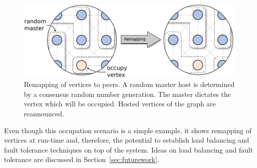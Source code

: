   \begin{figure}[H]
    \centering
    \includegraphics[width=\textwidth]{graphics/40_gol_remapping}
    \caption{Remapping of vertices to peers. A random master host is
      determined by a consensus random number generation. The master
      dictates the vertex which will be occupied. Hosted vertices of the
      graph are reannounced.}
    \label{fig:gol_remapping}
  \end{figure}

\noindent Even though this occupation scenario is a simple example, it
shows remapping of vertices at run-time and, therefore, the potential
to establish load balancing and fault tolerance techniques on top of
the system. Ideas on load balancing and fault tolerance are discussed
in Section~\ref{sec:futurework}.

\cleardoublepage


